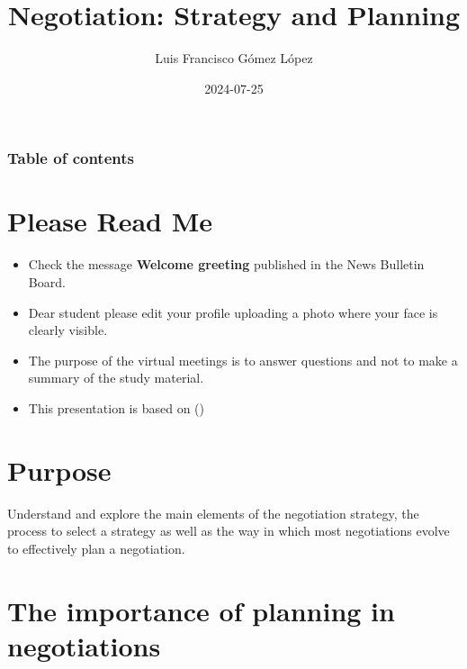 \documentclass[
  ignorenonframetext,
]{beamer}
\title{Negotiation: Strategy and Planning}
\author{Luis Francisco Gómez López}
\date{2024-07-25}
\institute{FAEDIS}
\renewcommand*\contentsname{Table of contents}
\newcommand\contentsname{Table of contents}
\begin{document}
\frame{\titlepage}

\renewcommand*\contentsname{Table of contents}
\begin{frame}[allowframebreaks]
  \frametitle{Table of contents}
  \tableofcontents[hideallsubsections]
\end{frame}

\section{Please Read Me}\label{please-read-me}

\begin{frame}{}
\label{section}
\begin{itemize}
\item
  Check the message \textbf{Welcome greeting} published in the News
  Bulletin Board.
\item
  Dear student please edit your profile uploading a photo where your
  face is clearly visible.
\item
  The purpose of the virtual meetings is to answer questions and not to
  make a summary of the study material.
\item
  This presentation is based on
  ()
\end{itemize}
\end{frame}

\section{Purpose}\label{purpose}

\begin{frame}{}
\label{section-1}
Understand and explore the main elements of the negotiation strategy,
the process to select a strategy as well as the way in which most
negotiations evolve to effectively plan a negotiation.
\end{frame}

\section{The importance of planning in
negotiations}\label{the-importance-of-planning-in-negotiations}
\end{document}
